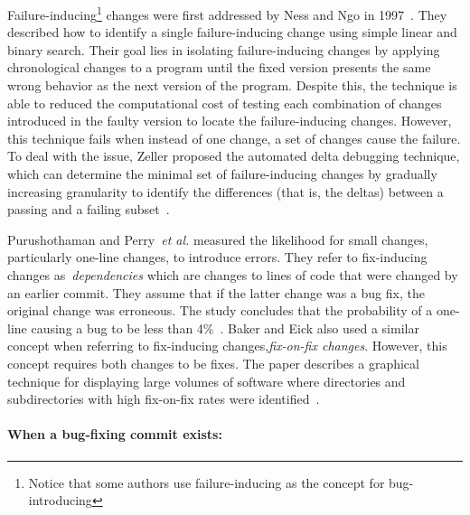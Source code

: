 \documentclass[a4paper, 12pt]{book}
\begin{document}
Failure-inducing\footnote{Notice that some authors use failure-inducing as the concept for bug-introducing} changes were first addressed by Ness and Ngo in 1997~\cite{ness1997regression}. They described how to identify a single failure-inducing change using simple linear and binary search. Their goal lies in isolating failure-inducing changes by applying chronological changes to a program until the fixed version presents the same wrong behavior as the next version of the program. Despite this, the technique is able to reduced the computational cost of testing each combination of changes introduced in the faulty version to locate the failure-inducing changes. However, this technique fails when instead of one change, a set of changes cause the failure. To deal with the issue, Zeller proposed the automated delta debugging technique, which can determine the minimal set of failure-inducing changes by gradually increasing granularity to identify the differences (that is, the deltas) between a passing and a failing subset~\cite{zeller1999yesterday}.

Purushothaman and Perry~\emph{et al.} measured the likelihood for small changes, particularly one-line changes, to introduce errors. They refer to fix-inducing changes as~\emph{dependencies} which are changes to lines of code that were changed by an earlier commit. They assume that if the latter change was a bug fix, the original change was erroneous. The study concludes that the probability of a one-line causing a bug to be less than 4\%~\cite{purushothaman2004towards}. Baker and Eick also used a similar concept when referring to fix-inducing changes,\emph{fix-on-fix changes}. However, this concept requires both changes to be fixes. The paper describes a graphical technique for displaying large volumes of software where directories and subdirectories with high fix-on-fix rates were identified~\cite{baker1994visualizing}.

\paragraph{When a bug-fixing commit exists:}
\end{document}
